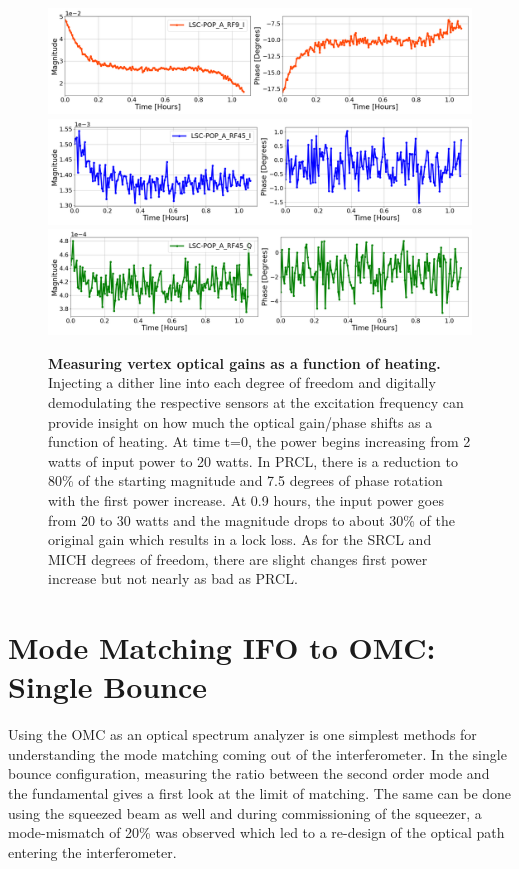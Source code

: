 	\begin{figure}[!]
		\centering
		\includegraphics[width=1.0 \textwidth]{../Figures/PRCL_EXC_LSC-POP_A_RF9_I.png}
		\includegraphics[width=1.0 \textwidth]{../Figures/SRCL_EXC_LSC-POP_A_RF45_I.png}
		\includegraphics[width=1.0 \textwidth]{../Figures/MICH_EXC_LSC-POP_A_RF45_Q.png}
		\caption[Measuring vertex optical gains as a function of heating.]  
		{\textbf{Measuring vertex optical gains as a function of heating.}
			Injecting a dither line into each degree of freedom and digitally demodulating the respective sensors at the excitation frequency can provide insight on how much the optical gain/phase shifts as a function of heating. At time t=0, the power begins increasing from 2 watts of input power to 20 watts. In PRCL, there is a reduction to 80\% of the starting magnitude and 7.5 degrees of phase rotation with the first power increase. At 0.9 hours, the input power goes from 20 to 30 watts and the magnitude drops to about 30\% of the original gain which results in a lock loss.  As for the SRCL and MICH degrees of freedom, there are slight changes first power increase but not nearly as bad as PRCL.
		}
		\label{fig:POP18_POP90}
	\end{figure}

\section{Mode Matching IFO to OMC: Single Bounce}
	Using the OMC as an optical spectrum analyzer is one simplest methods for understanding the mode matching coming out of the interferometer.  In the single bounce configuration, measuring the ratio between the second order mode and the fundamental gives a first look at the limit of matching.  The same can be done using the squeezed beam as well and during commissioning of the squeezer, a mode-mismatch of 20\% was observed which led to a re-design of the optical path entering the interferometer. 
